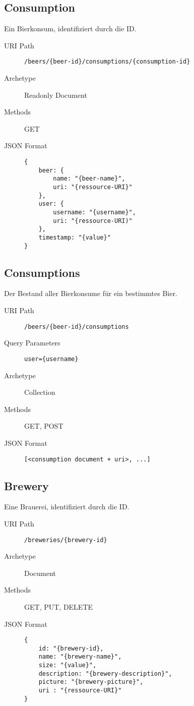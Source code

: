 \documentclass[10pt,a4paper]{scrartcl}
\begin{document}
\subsection{Consumption}

Ein Bierkonsum, identifiziert durch die ID.

\begin{description}
	\item[URI Path] \texttt{/beers/\{beer-id\}/consumptions/\{consumption-id\}}
	\item[Archetype] Readonly Document
	\item[Methods] GET
	\item[JSON Format] \hfill
\begin{lstlisting}
{
	beer: {
		name: "{beer-name}",
		uri: "{ressource-URI}"
	},
	user: {
		username: "{username}",
		uri: "{ressource-URI)"
	},
	timestamp: "{value}"
}
\end{lstlisting}
\end{description}


\subsection{Consumptions}

Der Bestand aller Bierkonsume für ein bestimmtes Bier.

\begin{description}
	\item[URI Path] \texttt{/beers/\{beer-id\}/consumptions}
 	\item[Query Parameters] \texttt{user=\{username\}}
	\item[Archetype] Collection
	\item[Methods] GET, POST
	\item[JSON Format] \hfill
\begin{lstlisting}
[<consumption document + uri>, ...]
\end{lstlisting}
\end{description}


\subsection{Brewery}

Eine Brauerei, identifiziert durch die ID.

\begin{description}
	\item[URI Path] \texttt{/breweries/\{brewery-id\}}
	\item[Archetype] Document
	\item[Methods] GET, PUT, DELETE
	\item[JSON Format] \hfill
\begin{lstlisting}
{	
	id: "{brewery-id},
	name: "{brewery-name}",
	size: "{value}",
	description: "{brewery-description}",
	picture: "{brewery-picture}",
	uri : "{ressource-URI}"
}
\end{lstlisting}
\end{description}
\end{document}
